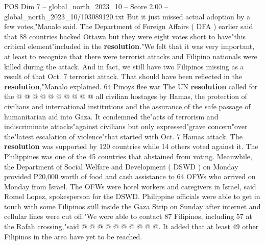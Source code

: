 \begin{textsample}{POS Dim 7 – global\_north\_2023\_10 – Score 2.00 – global\_north\_2023\_10/103089120.txt}
But it just missed actual adoption by a few votes,"Manalo said.
The Department of Foreign Affairs ( DFA ) earlier said that 88 countries backed Ottawa but they were eight votes short to have"this critical element"included in the \textbf{resolution}."We felt that it was very important, at least to recognize that there were terrorist attacks and Filipino nationals were killed during the attack.
And in fact, we still have two Filipinos missing as a result of that Oct. 7 terrorist attack.
That should have been reflected in the \textbf{resolution},"Manalo explained. 64 Pinoys flee war The UN \textbf{resolution} called for the @ @ @ @ @ @ @ @ @ @ all civilian hostages by Hamas, the protection of civilians and international institutions and the assurance of the safe passage of humanitarian aid into Gaza.
It condemned the"acts of terrorism and indiscriminate attacks"against civilians but only expressed"grave concern"over the"latest escalation of violence"that started with Oct. 7 Hamas attack.
The \textbf{resolution} was supported by 120 countries while 14 others voted against it.
The Philippines was one of the 45 countries that abstained from voting.
Meanwhile, the Department of Social Welfare and Development ( DSWD ) on Monday provided P20,000 worth of food and cash assistance to 64 OFWs who arrived on Monday from Israel.
The OFWs were hotel workers and caregivers in Israel, said Romel Lopez, spokesperson for the DSWD.
Philippine officials were able to get in touch with some Filipinos still inside the Gaza Strip on Sunday after internet and cellular lines were cut off."We were able to contact 87 Filipinos, including 57 at the Rafah crossing,"said @ @ @ @ @ @ @ @ @ @.
It added that at least 49 other Filipinos in the area have yet to be reached.

\end{textsample}
